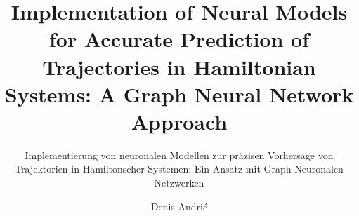 \documentclass[
	ngerman,
	ruledheaders=section,%
	class=report,%
	thesis={type=master},%
	accentcolor=9c,%
	custommargins=true,%
	marginpar=false,%
	parskip=half-,%
	fontsize=11pt,%
]{tudapub}
\begin{document}

\title{Implementation of Neural Models for Accurate Prediction of Trajectories in Hamiltonian Systems: A Graph Neural Network Approach}
\subtitle{Implementierung von neuronalen Modellen zur präzisen Vorhersage von Trajektorien in Hamiltonscher Systemen: 
	Ein Ansatz mit Graph-Neuronalen Netzwerken}
\author[D. Andrić]{Denis Andrić}

\submissiondate{\today}
\examdate{\today}
\end{document}
